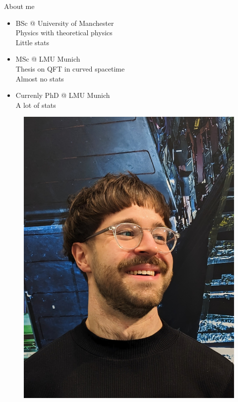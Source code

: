 \documentclass[
aspectratio=169,
14pt,
professionalfonts
]{beamer}
\begin{document}
\begin{frame}{About me}
    \begin{minipage}{0.69\textwidth}
        \begin{itemize}
            \item BSc @ University of Manchester \\
                Physics with theoretical physics\\
                Little stats
            \item MSc @ LMU Munich \\
                Thesis on QFT in curved spacetime\\
                Almost no stats
            \item Currenly PhD @ LMU Munich\\
                A lot of stats
        \end{itemize}
    \end{minipage}
    \begin{minipage}{0.3\textwidth}
        \begin{figure}
            \center
            \includegraphics[width=\textwidth]{../plots/port.jpg}
        \end{figure}
    \end{minipage}
\end{frame}
\end{document}
